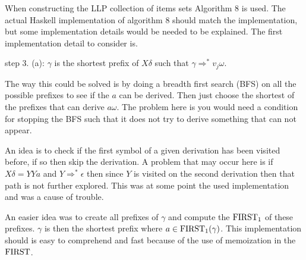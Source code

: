 When constructing the LLP collection of items sets Algorithm 8 \cite[13]{Vagner2007} is used. The actual Haskell implementation of algorithm 8 should match the implementation, but some implementation details would be needed to be explained. The first implementation detail to consider is. 
\begin{center}
    step 3. (a): $\gamma$ is the shortest prefix of $X\delta$ such that $\gamma \Rightarrow^* v_j \omega$. 
\end{center}
The way this could be solved is by doing a breadth first search (BFS) on all the possible prefixes to see if the $a$ can be derived. Then just choose the shortest of the prefixes that can derive $a\omega$.  The problem here is you would need a condition for stopping the BFS such that it does not try to derive something that can not appear.

An idea is to check if the first symbol of a given derivation has been visited before, if so then skip the derivation. A problem that may occur here is if $X\delta = YYa$ and $Y \Rightarrow^* \epsilon$ then since $Y$ is visited on the second derivation then that path is not further explored. This was at some point the used implementation and was a cause of trouble.

An easier idea was to create all prefixes of $\gamma$ and compute the $\text{FIRST}_1$ of these prefixes. $\gamma$ is then the shortest prefix where $a \in \text{FIRST}_1(\gamma)$. This implementation should is easy to comprehend and fast because of the use of memoization in the $\text{FIRST}$.
